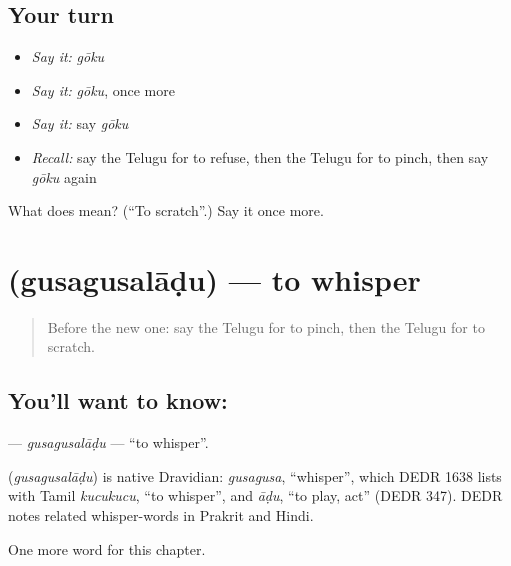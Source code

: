\subsection*{Your turn}
\begin{itemize}
\raggedright
  \item \emph{Say it:} \emph{gōku}
  \item \emph{Say it:} \emph{gōku}, once more
  \item \emph{Say it:} say \emph{gōku}
  \item \emph{Recall:} say the Telugu for to refuse, then the Telugu for to pinch, then say \emph{gōku} again
\end{itemize}

\begin{tcolorbox}[breakable,colback=teal!4,colframe=teal!35!black,title={Before you move on}]
What does  mean? (\textquotedblleft{}To scratch\textquotedblright{}.) Say it once more.
\end{tcolorbox}
\section[\texorpdfstring{\te{గుసగుసలాడు} (gusagusalāḍu)}{గుసగుసలాడు (gusagusalāḍu)}]{ (gusagusalāḍu) — to whisper}

\label{lesson:TE-C247-gusagusaladu}



\begin{quote}
Before the new one: say the Telugu for to pinch, then the Telugu for to scratch.
\end{quote}

\subsection*{You'll want to know: }
\textbf{} — \emph{gusagusalāḍu} — \textquotedblleft{}to whisper\textquotedblright{}.

\begin{cousinweb}
\textbf{} (\emph{gusagusalāḍu}) is native Dravidian: \emph{gusagusa}, \textquotedblleft{}whisper\textquotedblright{}, which DEDR 1638 lists with Tamil \emph{kucukucu}, \textquotedblleft{}to whisper\textquotedblright{}, and \emph{āḍu}, \textquotedblleft{}to play, act\textquotedblright{} (DEDR 347). DEDR notes related whisper-words in Prakrit and Hindi.
\end{cousinweb}

\begin{grammarlens}[title={What you've built}]
One more word for this chapter.
\end{grammarlens}

